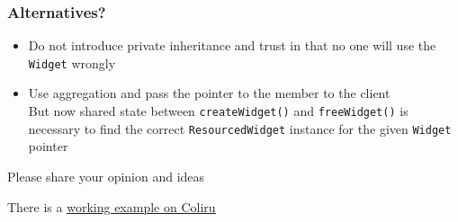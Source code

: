 \documentclass{beamer}
\def\code#1{\texttt{#1}}
\def\link#1#2{\href{#1}{\usebeamercolor[fg]{structure} \underline{#2}}}
\begin{document}

\begin{frame}[fragile]
\frametitle{Alternatives?}
	\begin{itemize}
	\item Do not introduce private inheritance and trust in that no one will use the \code{Widget} wrongly
	\pause
	\item Use aggregation and pass the pointer to the member to the client\\
	But now shared state between \code{createWidget()} and \code{freeWidget()} is necessary to find the correct \code{ResourcedWidget} instance for the given \code{Widget} pointer
	\end{itemize}
	
	\pause
	\bigskip
	Please share your opinion and ideas
	
	\bigskip
	There is a \link{http://coliru.stacked-crooked.com/a/e68e29b6461b083e}{working example on Coliru}
\end{frame}

\end{document}
